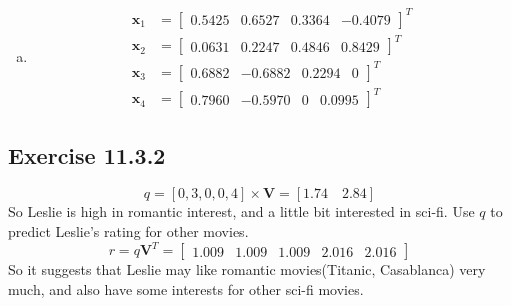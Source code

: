 \documentclass[11pt]{article}
\newcommand{\bx}{ \bm{x} }
\newcommand{\bV}{ \bm{V} }
\begin{document}
\begin{enumerate}[(a)]
\item
  \begin{align*}
\bx_1 &=
  \begin{bmatrix}
    0.5425 & 0.6527 & 0.3364 & {-0.4079}
  \end{bmatrix}^T \\
  \bx_2 &=
  \begin{bmatrix}
    0.0631 & 0.2247 & 0.4846 & 0.8429
  \end{bmatrix}^T \\
  \bx_3 &=
  \begin{bmatrix}
    0.6882 & {-0.6882} & 0.2294 & 0
  \end{bmatrix}^T \\
  \bx_4 &=
  \begin{bmatrix}
    0.7960 & {-0.5970} & 0 & {0.0995}
  \end{bmatrix}^T
\end{align*}
\end{enumerate}

\subsection*{Exercise 11.3.2}
\[
  q = [0, 3, 0, 0, 4] \times \bV = [1.74 \quad 2.84]
\]
So Leslie is high in romantic interest, and a little bit interested in sci-fi.
Use $q$ to predict Leslie's rating for other movies.
\[
  r = q \bV^T =
  \begin{bmatrix}
    1.009 & 1.009 & 1.009 & 2.016 & 2.016
  \end{bmatrix}
\]
So it suggests that Leslie may like romantic movies(Titanic, Casablanca) very
much, and also have some interests for other sci-fi movies.
\end{document}
